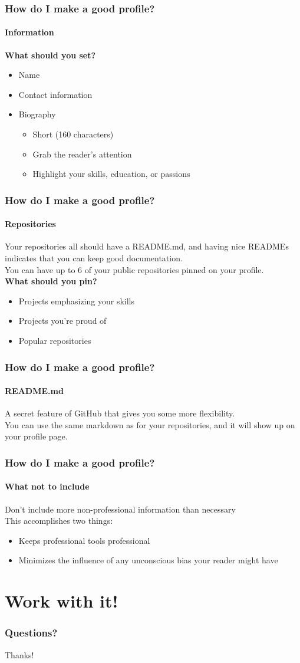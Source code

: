 \documentclass{beamer}
\begin{document}
\begin{frame}
  \frametitle{How do I make a good profile?}
  \framesubtitle{Information}
  \textbf{What should you set?}\pause
  \begin{itemize}[<+->]
    \item Name
    \item Contact information
    \item Biography
    \begin{itemize}
      \item Short (160 characters)
      \item Grab the reader's attention
      \item Highlight your skills, education, or passions
    \end{itemize}
  \end{itemize}
\end{frame}

\begin{frame}
  \frametitle{How do I make a good profile?}
  \framesubtitle{Repositories}
  Your repositories all should have a README.md, and having nice READMEs indicates that you can keep good documentation.\\\pause
  You can have up to 6 of your public repositories pinned on your profile.\pause\\
  \textbf{What should you pin?}
  \begin{itemize}[<+->]
    \item Projects emphasizing your skills
    \item Projects you're proud of
    \item Popular repositories
  \end{itemize}
\end{frame}

\begin{frame}
  \frametitle{How do I make a good profile?}
  \framesubtitle{README.md}
  A secret feature of GitHub that gives you some more flexibility.\\
  You can use the same markdown as for your repositories, and it will show up on your profile page.
\end{frame}

\begin{frame}
  \frametitle{How do I make a good profile?}
  \framesubtitle{What not to include}
  Don't include more non-professional information than necessary\\\pause
  This accomplishes two things:
  \begin{itemize}[<+->]
    \item Keeps professional tools professional
    \item Minimizes the influence of any unconscious bias your reader might have
  \end{itemize}
\end{frame}

\section{Work with it!} %
\begin{frame}
  \frametitle{Questions?}
\end{frame}

\begin{frame}[plain]
  Thanks!
\end{frame}
\end{document}
